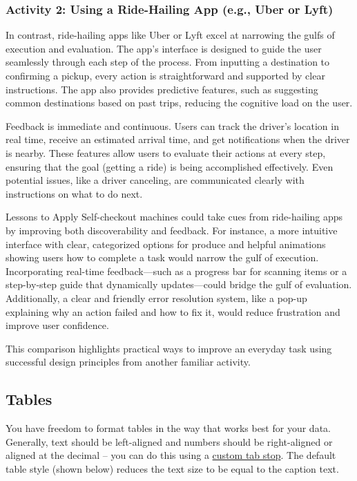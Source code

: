 \documentclass[
	letterpaper, %
]{jdf}
\begin{document}
\subsubsection {Activity 2: Using a Ride-Hailing App (e.g., Uber or Lyft)}
In contrast, ride-hailing apps like Uber or Lyft excel at narrowing the gulfs of execution and evaluation. The app’s interface is designed to guide the user seamlessly through each step of the process. From inputting a destination to confirming a pickup, every action is straightforward and supported by clear instructions. The app also provides predictive features, such as suggesting common destinations based on past trips, reducing the cognitive load on the user.

Feedback is immediate and continuous. Users can track the driver’s location in real time, receive an estimated arrival time, and get notifications when the driver is nearby. These features allow users to evaluate their actions at every step, ensuring that the goal (getting a ride) is being accomplished effectively. Even potential issues, like a driver canceling, are communicated clearly with instructions on what to do next.

Lessons to Apply
Self-checkout machines could take cues from ride-hailing apps by improving both discoverability and feedback. For instance, a more intuitive interface with clear, categorized options for produce and helpful animations showing users how to complete a task would narrow the gulf of execution. Incorporating real-time feedback—such as a progress bar for scanning items or a step-by-step guide that dynamically updates—could bridge the gulf of evaluation. Additionally, a clear and friendly error resolution system, like a pop-up explaining why an action failed and how to fix it, would reduce frustration and improve user confidence.

This comparison highlights practical ways to improve an everyday task using successful design principles from another familiar activity.
\newpage



\subsection{Tables}
You have freedom to format tables in the way that works best for your data. Generally, text should be left-aligned and numbers should be right-aligned or aligned at the decimal – you can do this using a \href{https://practicaltypography.com/tabs-and-tab-stops.html}{custom tab stop}. The default table style (shown below) reduces the text size to be equal to the caption text.
\end{document}
